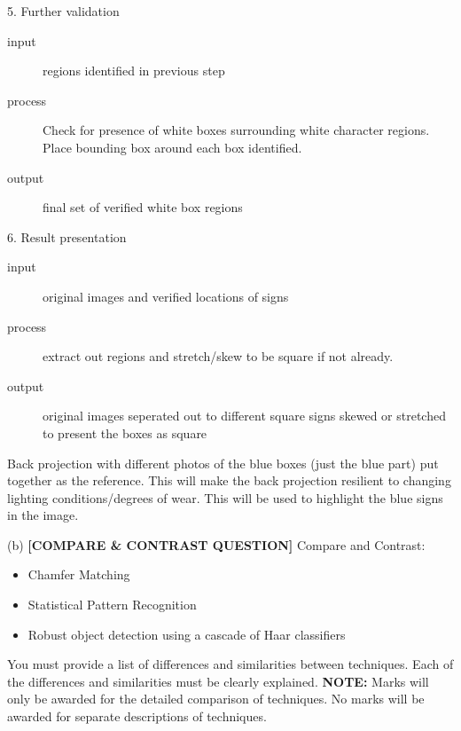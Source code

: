 5. Further validation
\begin{description}
  \item[input] regions identified in previous step
  \item[process] Check for presence of white boxes surrounding white character regions. Place bounding box around each box identified.
  \item[output] final set of verified white box regions 
\end{description}
6. Result presentation
\begin{description}
  \item[input] original images and verified locations of signs
  \item[process] extract out regions and stretch/skew to be square if not already.
  \item[output] original images seperated out to different square signs skewed or stretched to present the boxes as square 
\end{description}
Back projection with different photos of the blue boxes (just the blue part) put together as the reference. This will make the back projection resilient to changing lighting conditions/degrees of wear. This will be used to highlight the blue signs in the image.


\begin{tcolorbox}[title=Question]
  (b) \textbf{[COMPARE \& CONTRAST QUESTION]} Compare and Contrast: 
  \begin{itemize}
    \item Chamfer Matching
    \item Statistical Pattern Recognition
    \item Robust object detection using a cascade of Haar classifiers
  \end{itemize}
  You must provide a list of differences and similarities between techniques. Each of the differences and similarities must be clearly explained. \textbf{NOTE:} Marks will only be awarded for the detailed comparison of techniques. No marks will be awarded for separate descriptions of techniques.
  \begin{flushright}
    [25 marks]
  \end{flushright} 
\end{tcolorbox}


